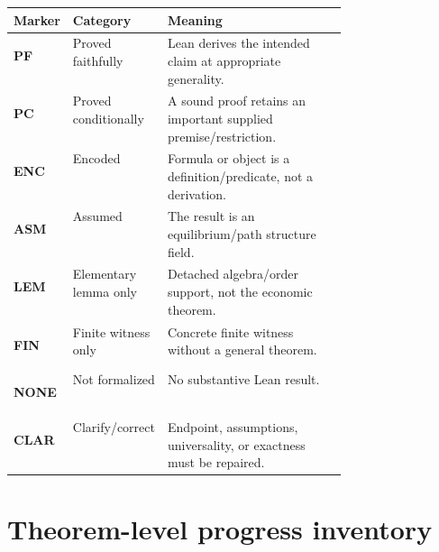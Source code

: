 \documentclass[11pt]{article}
\newcommand{\chip}[2]{\colorbox{#1}{\strut\scriptsize\textbf{#2}}}
\newcommand{\pf}{\chip{greenbg}{PF}}
\newcommand{\pc}{\chip{amberbg}{PC}}
\newcommand{\en}{\chip{amberbg}{ENC}}
\newcommand{\as}{\chip{amberbg}{ASM}}
\newcommand{\el}{\chip{amberbg}{LEM}}
\newcommand{\fw}{\chip{graybg}{FIN}}
\newcommand{\nf}{\chip{redbg}{NONE}}
\newcommand{\cl}{\chip{redbg}{CLAR}}
\begin{document}
\begin{tabularx}{\linewidth}{@{}p{0.14\linewidth}p{0.29\linewidth}X@{}}
\toprule
\textbf{Marker} & \textbf{Category} & \textbf{Meaning} \\
\midrule
\pf & Proved faithfully & Lean derives the intended claim at appropriate generality. \\
\pc & Proved conditionally & A sound proof retains an important supplied premise/restriction. \\
\en & Encoded & Formula or object is a definition/predicate, not a derivation. \\
\as & Assumed & The result is an equilibrium/path structure field. \\
\el & Elementary lemma only & Detached algebra/order support, not the economic theorem. \\
\fw & Finite witness only & Concrete finite witness without a general theorem. \\
\nf & Not formalized & No substantive Lean result. \\
\cl & Clarify/correct & Endpoint, assumptions, universality, or exactness must be repaired. \\
\bottomrule
\end{tabularx}

\section{Theorem-level progress inventory}
\end{document}
